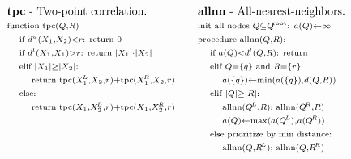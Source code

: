 \documentclass{article}
\newcommand{\disthrectmin}{d^{l}}
\newcommand{\disthrectmax}{d^{u}}
\newcommand{\dist}[2]{d(#1,#2)}
\newcommand{\kdroot}[1]{#1^{\!\text{\rm root}}}
\newcommand{\kdleft}[1]{#1^{\!L}}
\newcommand{\kdright}[1]{#1^{\!R}}
\newcommand{\al}{a^l}
\newcommand{\au}{a^u}
\newcommand{\dl}{d^l}
\newcommand{\du}{d^u}
\newcommand{\X}{\\ \scriptstyle}
\newcommand{\x}{\\ \hspace{0.15in} \scriptstyle}
\newcommand{\xx}{\\ \hspace{0.3in} \scriptstyle}
\begin{document}
\begin{figure}
  \begin{displaymath}
    \begin{array}{ll}
        \begin{array}{l}
          \text{{\bf tpc} - Two-point correlation.}
          \X \text{function tpc}(Q, R)
          \x \text{if }\disthrectmax(X_1, X_2) < r\text{: return }0
          \x \text{if }\disthrectmin(X_1, X_1) > r\text{: return } |X_1| \cdot |X_2|
          \x \text{elif }|X_1| \geq |X_2|\text{:}
          \xx \text{return tpc}(\kdleft{X_1}, X_2, r) + \text{tpc}(\kdright{X_1}, X_2, r)
          \x \text{else:}
          \xx \text{return tpc}(X_1, \kdleft{X_2}, r) + \text{tpc}(X_1, \kdright{X_2}, r)
          \X
          \X
          \X
        \end{array}
        &
        \begin{array}{l}
          \text{{\bf allnn} - All-nearest-neighbors.}
          \X \text{init all nodes }Q \subseteq \kdroot{Q}\text{: }a(Q) \gets \infty
          \X \text{procedure allnn}(Q,R)\text{:}
          \x \text{if }a(Q) < \disthrectmin(Q, R)\text{: return}
          \x \text{elif }Q = \{q\} \text{ and } R = \{r\}
          \xx a(\{q\}) \gets \min(a(\{q\}), \dist{Q}{R})
          \x \text{elif }|Q| \geq |R|\text{:}
          \xx \text{allnn}(\kdleft{Q}, R); \text{ allnn}(\kdright{Q}, R)
          \xx a(Q) \gets \max(a(\kdleft{Q}), a(\kdright{Q}))
          \x \text{else prioritize by min distance:}
          \xx \text{allnn}(Q, \kdleft{R}); \text{ allnn}(Q, \kdright{R})
        \end{array}

\end{array}
\end{displaymath}
\end{figure}
\end{document}
